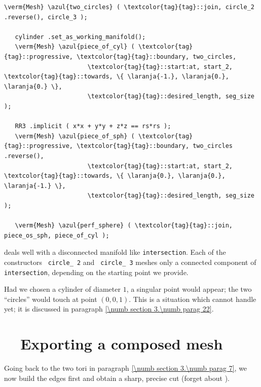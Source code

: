 \begin{Verbatim}[commandchars=\\\{\},formatcom=\small\tt,frame=single,
   label=parag-\ref{\numb section 3.\numb parag 19}.cpp,rulecolor=\color{coment},
   baselinestretch=0.94,framesep=2mm                                            ]
   \verm{Mesh} \azul{two_circles} ( \textcolor{tag}{tag}::join, circle_2 .reverse(), circle_3 );

   cylinder .set_as_working_manifold();
   \verm{Mesh} \azul{piece_of_cyl} ( \textcolor{tag}{tag}::progressive, \textcolor{tag}{tag}::boundary, two_circles,
                       \textcolor{tag}{tag}::start:at, start_2, \textcolor{tag}{tag}::towards, \{ \laranja{-1.}, \laranja{0.}, \laranja{0.} \},
                       \textcolor{tag}{tag}::desired_length, seg_size                         );

   RR3 .implicit ( x*x + y*y + z*z == rs*rs );
   \verm{Mesh} \azul{piece_of_sph} ( \textcolor{tag}{tag}::progressive, \textcolor{tag}{tag}::boundary, two_circles .reverse(),
                       \textcolor{tag}{tag}::start:at, start_2, \textcolor{tag}{tag}::towards, \{ \laranja{0.}, \laranja{0.}, \laranja{-1.} \},
                       \textcolor{tag}{tag}::desired_length, seg_size                         );

   \verm{Mesh} \azul{perf_sphere} ( \textcolor{tag}{tag}::join, piece_os_sph, piece_of_cyl );
\end{Verbatim}

{\ManiFEM} deals well with a disconnected manifold like {\small\tt intersection}.
Each of the constructors {\small\tt{} circle\_\,2} and {\small\tt{} circle\_\,3}
meshes only a connected component of {\small\tt intersection}, depending on the starting point
we provide.

Had we chosen a cylinder of diameter $1$, a singular point would appear;
the two ``circles'' would touch at point $ (0,0,1) $.
This is a situation which {\maniFEM} cannot handle yet; it is discussed in paragraph
\ref{\numb section 3.\numb parag 22}.


\section{~~Exporting a composed mesh}\label{\numb section 3.\numb parag 20}

Going back to the two tori in paragraph \ref{\numb section 3.\numb parag 7},
we now build the edges first and obtain a sharp, precise cut
(forget about {\small\tt{}}).

